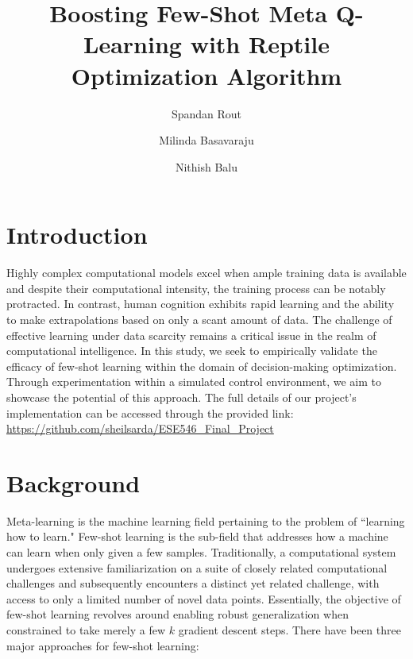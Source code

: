 \documentclass[runningheads]{llncs}
\begin{document}
\title{Boosting Few-Shot Meta Q-Learning with Reptile Optimization Algorithm}
\author{Spandan Rout\and
Milinda Basavaraju\and
Nithish Balu}



\maketitle

\section{Introduction}
Highly complex computational models excel when ample training data is available and despite their computational intensity, the training process can be notably protracted. In contrast, human cognition exhibits rapid learning and the ability to make extrapolations based on only a scant amount of data. The challenge of effective learning under data scarcity remains a critical issue in the realm of computational intelligence. In this study, we seek to empirically validate the efficacy of few-shot learning within the domain of decision-making optimization. Through experimentation within a simulated control environment, we aim to showcase the potential of this approach. The full details of our project's implementation can be accessed through the provided link: \url{https://github.com/sheilsarda/ESE546_Final_Project} 

\section{Background}
Meta-learning is the machine learning field pertaining to the problem of ``learning how to learn." Few-shot learning is the sub-field that addresses how a machine can learn when only given a few samples. Traditionally, a computational system undergoes extensive familiarization on a suite of closely related computational challenges and subsequently encounters a distinct yet related challenge, with access to only a limited number of novel data points. Essentially, the objective of few-shot learning revolves around enabling robust generalization when constrained to take merely a few $k$ gradient descent steps. There have been three major approaches for few-shot learning:
\end{document}
